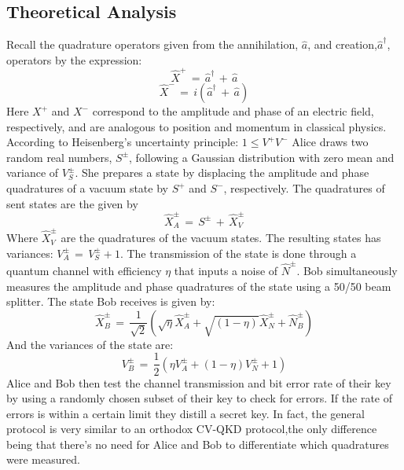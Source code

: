 \begin{refsection}
\subsection{Theoretical Analysis}
Recall the quadrature operators given from the annihilation, $\hat{a}$, and creation,$\hat{a}^\dagger$, operators by the expression:
\begin{equation}
\hat{X}^+\,=\,\hat{a}^\dagger\,+\,\hat{a}
\end{equation}
\begin{equation}
\hat{X}^-\,=\,i\left(\hat{a}^\dagger\,+\,\hat{a}\right)
\end{equation}
Here $X^+$ and $X^-$ correspond to the amplitude and phase of an electric field, respectively, and are analogous to position and momentum in classical physics. According to Heisenberg's uncertainty principle: $1\le V^+V^-$ Alice draws two random real numbers, $S^\pm$, following a Gaussian distribution with zero mean and variance of $V_S^\pm$. She prepares a state by displacing the amplitude and phase quadratures of a vacuum state by $S^+$ and $S^-$, respectively. The quadratures of sent states are the given by 
\begin{equation}
\hat{X}_A^\pm\,=\,S^\pm\,+\,\hat{X}_V^\pm
\end{equation}
Where $\hat{X}^\pm_V$ are the quadratures of the vacuum states. The resulting states has variances: $V_A^\pm\,=\,V_S^\pm+1$. The transmission of the state is done through a quantum channel with efficiency $\eta$ that inputs a noise of  $\hat{N}^\pm$. Bob simultaneously measures the amplitude and phase quadratures of the state using a 50/50 beam splitter. The state Bob receives is given by:\\
\begin{equation}
\hat{X}_B^\pm\,=\,\frac{1}{\sqrt{2}}\left(\sqrt{\eta}\hat{X}_A^\pm+\sqrt{\left(1-\eta\right)}\hat{X}_N^\pm+\hat{N}_B^\pm\right)
\end{equation}
And the variances of the state are:\\
\begin{equation}
V_B^\pm\,=\,\frac{1}{2}\left(\eta V_A^\pm+\left(1-\eta\right)V_N^\pm+1\right)
\end{equation}
Alice and Bob then test the channel transmission and bit error rate of their key by using a randomly chosen subset of their key to check for errors. If the rate of errors is within a certain limit they distill a secret key. In fact, the general protocol is very similar to an orthodox CV-QKD protocol,the only difference being that there's no need for Alice and Bob to differentiate which quadratures were measured.\\

\end{refsection}
